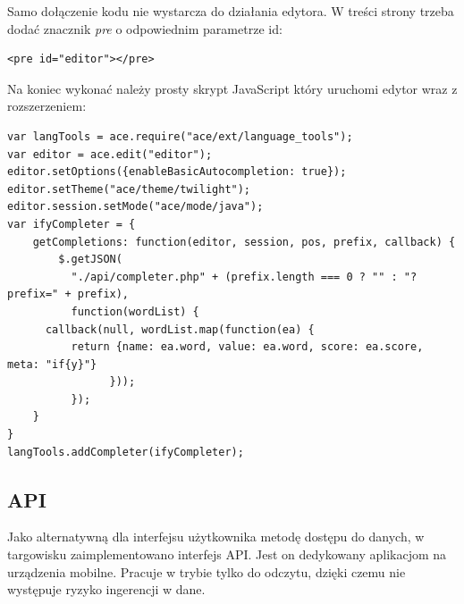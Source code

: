 \documentclass[11pt,a4paper,polish,thesis]{dcsbook}
\begin{document}
Samo dołączenie kodu nie wystarcza do działania edytora. W treści strony trzeba dodać znacznik \emph{pre} o odpowiednim parametrze id:
\begin{verbatim}
<pre id="editor"></pre>
\end{verbatim}

Na koniec wykonać należy prosty skrypt JavaScript który uruchomi edytor wraz z rozszerzeniem:
\begin{verbatim}
var langTools = ace.require("ace/ext/language_tools");
var editor = ace.edit("editor");
editor.setOptions({enableBasicAutocompletion: true});
editor.setTheme("ace/theme/twilight");
editor.session.setMode("ace/mode/java");
var ifyCompleter = {
    getCompletions: function(editor, session, pos, prefix, callback) {
        $.getJSON(
          "./api/completer.php" + (prefix.length === 0 ? "" : "?prefix=" + prefix),
          function(wordList) {
      callback(null, wordList.map(function(ea) {
          return {name: ea.word, value: ea.word, score: ea.score, meta: "if{y}"}
                }));
          });
    }
}
langTools.addCompleter(ifyCompleter);
\end{verbatim}
\subsection{API}
Jako alternatywną dla interfejsu użytkownika metodę dostępu do danych, w targowisku zaimplementowano interfejs API. Jest on dedykowany aplikacjom na urządzenia mobilne.
Pracuje w trybie tylko do odczytu, dzięki czemu nie występuje ryzyko ingerencji w dane.
\end{document}
